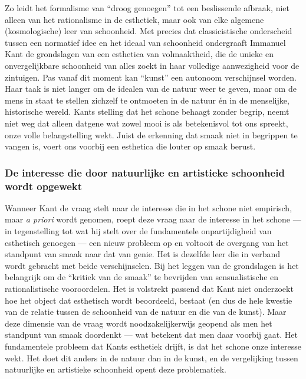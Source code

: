 Zo leidt het formalisme van ``droog genoegen'' tot een beslissende afbraak, niet alleen van het rationalisme in de esthetiek, maar ook van elke algemene (kosmologische) leer van schoonheid. Met precies dat classicistische onderscheid tussen een normatief idee en het ideaal van schoonheid ondergraaft Immanuel Kant de grondslagen van een esthetica van volmaaktheid, die de unieke en onvergelijkbare schoonheid van alles zoekt in haar volledige aanwezigheid voor de zintuigen.
Pas vanaf dit moment kan ``kunst'' een autonoom verschijnsel worden. Haar taak is niet langer om de idealen van de natuur weer te geven, maar om de mens in staat te stellen zichzelf te ontmoeten in de natuur én in de menselijke, historische wereld.
Kants stelling dat het schone behaagt zonder begrip, neemt niet weg dat alleen datgene wat zowel mooi is als betekenisvol tot ons spreekt, onze volle belangstelling wekt. Juist de erkenning dat smaak niet in begrippen te vangen is, voert ons voorbij een esthetica die louter op smaak berust.

\subsubsection{De interesse die door natuurlijke en artistieke schoonheid wordt opgewekt}

Wanneer Kant de vraag stelt naar de interesse die in het schone niet empirisch, maar \textit{a priori} wordt genomen, roept deze vraag naar de interesse in het schone — in tegenstelling tot wat hij stelt over de fundamentele onpartijdigheid van esthetisch genoegen — een nieuw probleem op en voltooit de overgang van het standpunt van smaak naar dat van genie. Het is dezelfde leer die in verband wordt gebracht met beide verschijnselen. Bij het leggen van de grondslagen is het belangrijk om de ``kritiek van de smaak'' te bevrijden van sensualistische en rationalistische vooroordelen. Het is volstrekt passend dat Kant niet onderzoekt hoe het object dat esthetisch wordt beoordeeld, bestaat (en dus de hele kwestie van de relatie tussen de schoonheid van de natuur en die van de kunst). Maar deze dimensie van de vraag wordt noodzakelijkerwijs geopend als men het standpunt van smaak doordenkt — wat betekent dat men daar voorbij gaat.
Het fundamentele probleem dat Kants esthetiek drijft, is dat het schone onze interesse wekt. Het doet dit anders in de natuur dan in de kunst, en de vergelijking tussen natuurlijke en artistieke schoonheid opent deze problematiek.

